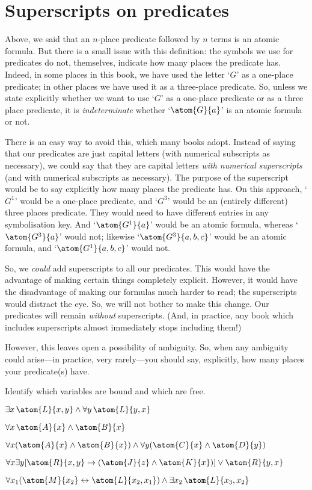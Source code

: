 \section{Superscripts on predicates}
Above, we said that an $n$-place predicate followed by $n$ terms is an atomic formula. But there is a small issue with this definition: the symbols we use for predicates do not, themselves, indicate how many places the predicate has. Indeed, in some places in this book, we have used the letter `$G$' as a one-place predicate; in other places we have used it as a three-place predicate. So, unless we state explicitly whether we want to use `$G$' as a one-place predicate or as a three place predicate, it is \emph{indeterminate} whether `$\atom{G}{a}$' is an atomic formula or not.

There is an easy way to avoid this, which many books adopt. Instead of saying that our predicates are just capital letters (with numerical subscripts as necessary), we could say that they are capital letters \emph{with numerical superscripts} (and with numerical subscripts as necessary). The purpose of the superscript would be to say explicitly how many places the predicate has. On this approach, `$G^1$' would be a one-place predicate, and `$G^3$' would be an (entirely different) three places predicate. They would need to have different entries in any symbolisation key. And `$\atom{G^1}{a}$' would be an atomic formula, whereas `$\atom{G^3}{a}$' would not; likewise `$\atom{G^3}{a,b,c}$' would be an atomic formula, and `$\atom{G^1}{a,b,c}$' would not.

So, we \emph{could} add superscripts to all our predicates. This would have the advantage of making certain things completely explicit. However, it would have the disadvantage of making our formulas much harder to read; the superscripts would distract the eye. So, we will not bother to make this change. Our predicates will remain \emph{without} superscripts.  (And, in practice, any book which includes superscripts almost immediately stops including them!)

However, this leaves open a possibility of ambiguity. So, when any ambiguity could arise---in practice, very rarely---you should say, explicitly, how many places your predicate(s) have.

\practiceproblems
\problempart
\label{pr.freeFOL}
Identify which variables are bound and which are free.
\begin{earg}
\item $\exists x\, \atom{L}{x,y} \eand \forall y\, \atom{L}{y,x}$
\item $\forall x\, \atom{A}{x} \eand \atom{B}{x}$
\item $\forall x (\atom{A}{x} \eand \atom{B}{x}) \eand \forall y(\atom{C}{x} \eand \atom{D}{y})$
\item $\forall x\exists y[\atom{R}{x,y} \eif (\atom{J}{z} \eand \atom{K}{x})] \eor \atom{R}{y,x}$
\item $\forall x_1(\atom{M}{x_2} \eiff \atom{L}{x_2,x_1}) \eand \exists x_2\,\atom{L}{x_3,x_2}$
\end{earg}


